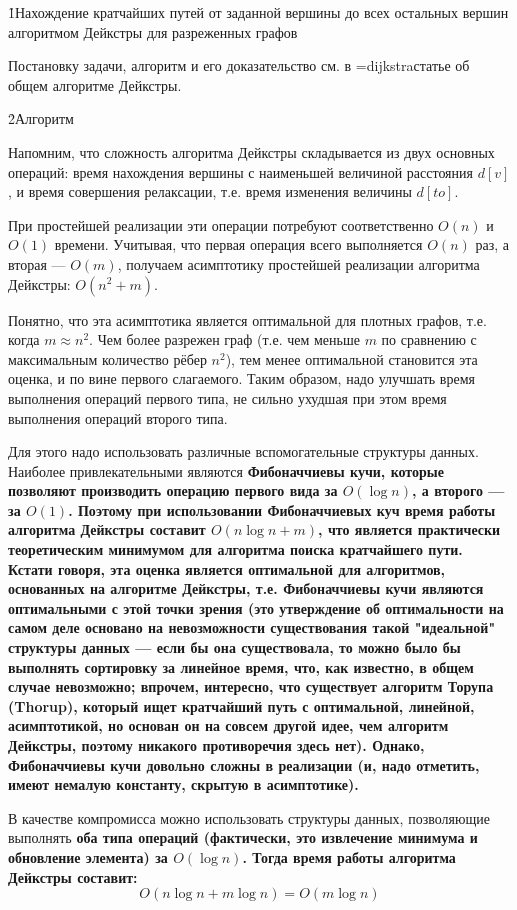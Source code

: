 \h1{Нахождение кратчайших путей от заданной вершины до всех остальных вершин алгоритмом Дейкстры для разреженных графов}

Постановку задачи, алгоритм и его доказательство см. в \algohref=dijkstra{статье об общем алгоритме Дейкстры}.

\h2{Алгоритм}

Напомним, что сложность алгоритма Дейкстры складывается из двух основных операций: время нахождения вершины с наименьшей величиной расстояния $d[v]$, и время совершения релаксации, т.е. время изменения величины $d[to]$.

При простейшей реализации эти операции потребуют соответственно $O(n)$ и $O(1)$ времени. Учитывая, что первая операция всего выполняется $O(n)$ раз, а вторая --- $O(m)$, получаем асимптотику простейшей реализации алгоритма Дейкстры: $O(n^2+m)$.

Понятно, что эта асимптотика является оптимальной для плотных графов, т.е. когда $m \approx n^2$. Чем более разрежен граф (т.е. чем меньше $m$ по сравнению с максимальным количество рёбер $n^2$), тем менее оптимальной становится эта оценка, и по вине первого слагаемого. Таким образом, надо улучшать время выполнения операций первого типа, не сильно ухудшая при этом время выполнения операций второго типа.

Для этого надо использовать различные вспомогательные структуры данных. Наиболее привлекательными являются \bf{Фибоначчиевы кучи}, которые позволяют производить операцию первого вида за $O(\log n)$, а второго --- за $O(1)$. Поэтому при использовании Фибоначчиевых куч время работы алгоритма Дейкстры составит $O(n \log n + m)$, что является практически теоретическим минимумом для алгоритма поиска кратчайшего пути. Кстати говоря, эта оценка является оптимальной для алгоритмов, основанных на алгоритме Дейкстры, т.е. Фибоначчиевы кучи являются оптимальными с этой точки зрения (это утверждение об оптимальности на самом деле основано на невозможности существования такой "идеальной" структуры данных --- если бы она существовала, то можно было бы выполнять сортировку за линейное время, что, как известно, в общем случае невозможно; впрочем, интересно, что существует алгоритм Торупа (Thorup), который ищет кратчайший путь с оптимальной, линейной, асимптотикой, но основан он на совсем другой идее, чем алгоритм Дейкстры, поэтому никакого противоречия здесь нет). Однако, Фибоначчиевы кучи довольно сложны в реализации (и, надо отметить, имеют немалую константу, скрытую в асимптотике).

В качестве компромисса можно использовать структуры данных, позволяющие выполнять \bf{оба типа операций} (фактически, это извлечение минимума и обновление элемента) за $O(\log n)$. Тогда время работы алгоритма Дейкстры составит:
$$ O(n \log n + m \log n) = O (m \log n) $$

